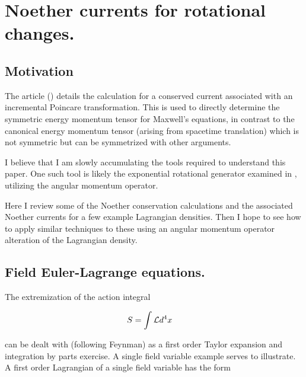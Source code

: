 

\chapter{Noether currents for rotational changes.}
\label{chap:rotationCurrents}
{}
\date{Sept 4, 2009}

\beginArtWithToc

\section{Motivation}

The article (\cite{montesinos2006sem}) details the calculation for a conserved current associated with an incremental Poincare transformation.  This is used to directly determine the symmetric energy momentum tensor for Maxwell's equations, in contrast to the canonical energy momentum tensor (arising from spacetime translation) which is not symmetric but can be symmetrized with other arguments.

I believe that I am slowly accumulating the tools required to understand this paper.  One such tool is likely the exponential rotational generator examined in , utilizing the angular momentum operator.

Here I review some of the Noether conservation calculations and the associated Noether currents for a few example Lagrangian densities.  Then I hope to see how to apply similar techniques to these using an angular momentum operator alteration of the Lagrangian density.

\section{Field Euler-Lagrange equations.}

The extremization of the action integral

\begin{align}\label{eqn:rotationCurrents:boo1}
S &= \int \mathcal{L} d^4 x
\end{align}

can be dealt with (following Feynman) as a first order Taylor expansion and integration by parts exercise.  A single field variable example serves to illustrate.  A first order Lagrangian of a single field variable has the form

